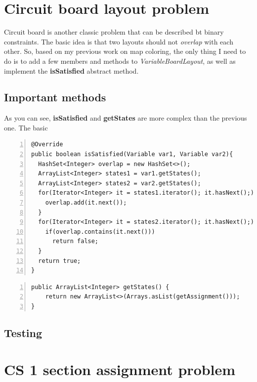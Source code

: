\documentclass{article}
\begin{document}
\clearpage
\section{Circuit board layout problem}
Circuit board is another classic problem that can be described bt binary constraints. The basic idea is that two layouts should not \emph{overlap } with each other. So, based on my previous work on map coloring, the only thing I need to do is to add a few members and methods to \emph{VariableBoardLayout}, as well as implement the \textbf{isSatisfied} abstract method.


\subsection{Important methods}
As you can see, \textbf{isSatisfied} and \textbf{getStates} are more complex than the previous one. The basic 

\begin{lstlisting}[numbers=left, caption=ConstraintsBoardLayout.class] 
@Override
public boolean isSatisfied(Variable var1, Variable var2){
  HashSet<Integer> overlap = new HashSet<>();
  ArrayList<Integer> states1 = var1.getStates();
  ArrayList<Integer> states2 = var2.getStates();
  for(Iterator<Integer> it = states1.iterator(); it.hasNext();){
    overlap.add(it.next());
  }
  for(Iterator<Integer> it = states2.iterator(); it.hasNext();){
    if(overlap.contains(it.next()))
      return false;
  }
  return true;
}
\end{lstlisting}

\begin{lstlisting}[numbers=left , caption=VariableBoradLayout.class]   
public ArrayList<Integer> getStates() {
    return new ArrayList<>(Arrays.asList(getAssignment()));
}
\end{lstlisting}


\subsection{Testing}








\section{CS 1 section assignment problem}
\end{document}
